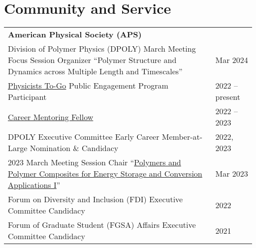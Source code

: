\documentclass[letterpaper,11pt]{article}
\begin{document}
\section*{Community and Service}
\vspace{-0.5\baselineskip}
\begin{longtable}{@{}p{}l@{}}
  \multicolumn{2}{l}{\hspace{-3mm} \bf{American Physical Society (APS)}} \\
  \hspace{3mm} Division of Polymer Physics (DPOLY) March Meeting Focus Session Organizer ``Polymer Structure and Dynamics across Multiple Length and Timescales''  & Mar 2024 \\
  \hspace{3mm} \href{https://www.aps.org/programs/outreach/physiciststogo.cfm}{Physicists To-Go} Public Engagement Program Participant                                                                        & 2022 -- present \\
  \hspace{3mm} \href{https://www.aps.org/careers/guidance/mentoring.cfm}{Career Mentoring Fellow}                                                                                                       & 2022 -- 2023 \\
  \hspace{3mm} DPOLY Executive Committee Early Career Member-at-Large Nomination \& Candidacy                                    & 2022, 2023 \\   
  \hspace{3mm} 2023 March Meeting Session Chair ``\href{https://meetings.aps.org/Meeting/MAR23/Session/Y15}{Polymers and Polymer Composites for Energy Storage and Conversion Applications I}''         & Mar 2023 \\
  \hspace{3mm} Forum on Diversity and Inclusion (FDI) Executive Committee Candidacy                                                                    & 2022 \\
  \hspace{3mm} Forum of Graduate Student (FGSA) Affairs Executive Committee Candidacy                                                                   & 2021 \\[4pt]

\end{longtable}
\end{document}

